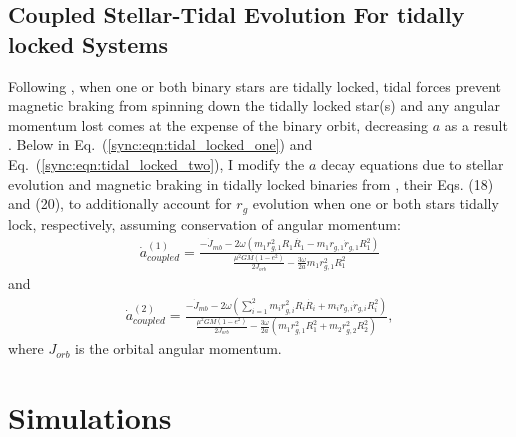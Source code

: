 \subsection{Coupled Stellar-Tidal Evolution For tidally locked Systems} \label{sync:sec:coupled}

Following \citet{Fleming2018}, when one or both binary stars are tidally locked, tidal forces prevent magnetic braking from spinning down the tidally locked star(s) and any angular momentum lost comes at the expense of the binary orbit, decreasing $a$ as a result \citep{Verbunt1981}.  Below in Eq.~(\ref{sync:eqn:tidal_locked_one}) and Eq.~(\ref{sync:eqn:tidal_locked_two}), I modify the $a$ decay equations due to stellar evolution and magnetic braking in tidally locked binaries from \citet{Fleming2018}, their Eqs. (18) and (20), to additionally account for $r_g$ evolution when one or both stars tidally lock, respectively, assuming conservation of angular momentum:
\small
\begin{equation} \label{sync:eqn:tidal_locked_one}
\begin{split}
\dot{a}_{coupled}^{(1)} = \frac{-\dot{J}_{mb} - 2 \omega \left( m_1 r_{g,1}^2 R_1 \dot{R_1} - m_1 r_{g,1} \dot{r}_{g,1} R_1^2 \right)}
{\frac{\mu^2 G M (1-e^2)}{2J_{orb}} - \frac{3 \omega}{2a} m_1 r_{g,1}^2 R_1^2}
\end{split}
\end{equation}
\normalsize
and
\small
\begin{equation} \label{sync:eqn:tidal_locked_two}
\begin{split}
\dot{a}_{coupled}^{(2)} = \frac{-\dot{J}_{mb} - 2 \omega \left( \sum_{i=1}^{2} m_i r_{g,i}^2 R_i \dot{R_i} + m_i r_{g,i} \dot{r}_{g,i} R_i^2 \right)}
{\frac{\mu^2 G M (1-e^2)}{2J_{orb}} - \frac{3 \omega}{2a} \left( m_1 r_{g,1}^2 R_1^2 + m_2 r_{g,2}^2 R_2^2 \right)},
\end{split}
\end{equation}
\normalsize
where $J_{orb}$ is the orbital angular momentum.

\section{Simulations} \label{sync:sec:simulations}

